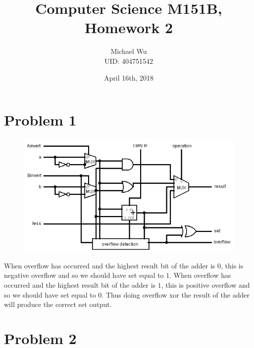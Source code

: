 \documentclass[12pt]{article}
\begin{document}
\title{Computer Science M151B, Homework 2}
\date{April 16th, 2018}
\author{Michael Wu\\UID: 404751542}
\maketitle

\section*{Problem 1}

\begin{figure}[ht]
    \begin{center}
        \includegraphics[width=\textwidth]{problem1.png}
    \end{center}
\end{figure}
When overflow has occurred and the highest result bit of the adder is \(0\), this is negative overflow and so we should have set
equal to \(1\). When overflow has occurred and the highest result bit of the adder is \(1\), this is positive overflow and so
we should have set equal to \(0\). Thus doing overflow xor the result of the adder will produce the correct set output.

\section*{Problem 2}
\end{document}
